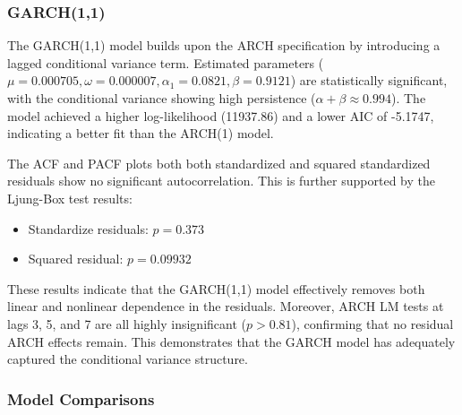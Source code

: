 \documentclass[12pt]{article}
\begin{document}
\subsubsection*{GARCH(1,1)}

The GARCH(1,1) model builds upon the ARCH specification by introducing a lagged conditional variance term. Estimated parameters ($\mu = 0.000705, \omega = 0.000007, \alpha_1 = 0.0821, \beta = 0.9121$) are statistically significant, with the conditional variance showing high persistence ($\alpha + \beta \approx 0.994$). The model achieved a higher log-likelihood (11937.86) and a lower AIC of -5.1747, indicating a better fit than the ARCH(1) model.

The ACF and PACF plots both both standardized and squared standardized residuals show no significant autocorrelation. This is further supported by the Ljung-Box test results:

\begin{itemize}
	\item Standardize residuals: $p=0.373$
	\item Squared residual: $p=0.09932$
\end{itemize}

These results indicate that the GARCH(1,1) model effectively removes both linear and nonlinear dependence in the residuals. Moreover, ARCH LM tests at lags 3, 5, and 7 are all highly insignificant ($p > 0.81$), confirming that no residual ARCH effects remain. This demonstrates that the GARCH model has adequately captured the conditional variance structure.

\subsubsection*{Model Comparisons}
\end{document}
